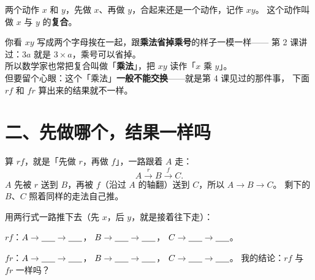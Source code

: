 \begin{definition}[复合]
  两个动作 \(x\) 和 \(y\)，先做 \(x\)、再做 \(y\)，合起来还是一个动作，记作 \(xy\)。
  这个动作叫做 \(x\) 与 \(y\) 的\textbf{复合}。
\end{definition}

\begin{definition}[为什么也管它叫「乘法」]
  你看 \(xy\) 写成两个字母挨在一起，跟\textbf{乘法省掉乘号}的样子一模一样——
  第 2 课讲过：\(3a\) 就是 \(3\times a\)，乘号可以省掉。\\[3pt]
  所以数学家也常把复合叫做「\textbf{乘法}」，把 \(xy\) 读作「\(x\) 乘 \(y\)」。\\[3pt]
  但要留个心眼：这个「乘法」\textbf{一般不能交换}——就是第 4 课见过的那件事，
  下面 \(rf\) 和 \(fr\) 算出来的结果就不一样。
\end{definition}

\section*{二、先做哪个，结果一样吗}

\begin{example}[先看一个示范]
  算 \(rf\)，就是「先做 \(r\)，再做 \(f\)」，一路跟着 \(A\) 走：
  \[
    A \xrightarrow{\ r\ } B \xrightarrow{\ f\ } C .
  \]
  \(A\) 先被 \(r\) 送到 \(B\)，再被 \(f\)（沿过 \(A\) 的轴翻）送到 \(C\)，所以 \(A\to B\to C\)。
  剩下的 \(B\)、\(C\) 照着同样的走法自己推。
\end{example}

\begin{dongshou}[跟老师一起算]
  用两行式一路推下去（先 \(x\)，后 \(y\)，就是接着往下走）：

  \(rf\)：\(A\to\underline{\hspace{1.6em}}\to\underline{\hspace{1.6em}}\)，
  \(B\to\underline{\hspace{1.6em}}\to\underline{\hspace{1.6em}}\)，
  \(C\to\underline{\hspace{1.6em}}\to\underline{\hspace{1.6em}}\)。

  \(fr\)：\(A\to\underline{\hspace{1.6em}}\to\underline{\hspace{1.6em}}\)，
  \(B\to\underline{\hspace{1.6em}}\to\underline{\hspace{1.6em}}\)，
  \(C\to\underline{\hspace{1.6em}}\to\underline{\hspace{1.6em}}\)。
  我的结论：\(rf\) 与 \(fr\) 一样吗？\underline{\hspace{3em}}
\end{dongshou}

